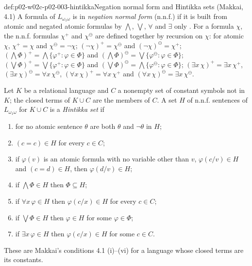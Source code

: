 \begin{hbdefinition}{def:p02-w02c-p02-003-hintikka}{Negation normal form and Hintikka sets (Makkai, 4.1)}
A formula of \(L_{\omega_1\omega}\) is in \emph{negation normal form}
(n.n.f.) if it is built from atomic and negated atomic formulas by
\(\bigwedge\), \(\bigvee\), \(\forall\) and \(\exists\) only
\cite[ch.~A.7, \S4, p.~249]{Makkai1977}.  For a formula \(\chi\), the
n.n.f. formulas \(\chi^{+}\) and \(\chi^{\ominus}\) are defined together
by recursion on \(\chi\): for atomic \(\chi\), \(\chi^{+}=\chi\) and
\(\chi^{\ominus}=\neg\chi\); \((\neg\chi)^{+}=\chi^{\ominus}\) and
\((\neg\chi)^{\ominus}=\chi^{+}\);
\((\bigwedge\Phi)^{+}=\bigwedge\{\varphi^{+}:\varphi\in\Phi\}\) and
\((\bigwedge\Phi)^{\ominus}=\bigvee\{\varphi^{\ominus}:\varphi\in\Phi\}\);
\((\bigvee\Phi)^{+}=\bigvee\{\varphi^{+}:\varphi\in\Phi\}\) and
\((\bigvee\Phi)^{\ominus}=\bigwedge\{\varphi^{\ominus}:\varphi\in\Phi\}\);
\((\exists x\,\chi)^{+}=\exists x\,\chi^{+}\),
\((\exists x\,\chi)^{\ominus}=\forall x\,\chi^{\ominus}\),
\((\forall x\,\chi)^{+}=\forall x\,\chi^{+}\) and
\((\forall x\,\chi)^{\ominus}=\exists x\,\chi^{\ominus}\).

Let \(K\) be a relational language and \(C\) a nonempty set of constant
symbols not in \(K\); the closed terms of \(K\cup C\) are the members of
\(C\).  A set \(H\) of n.n.f. sentences of \(L_{\omega_1\omega}\) for
\(K\cup C\) is a \emph{Hintikka set} if
\begin{enumerate}
\item[(i)] for no atomic sentence \(\theta\) are both \(\theta\) and
      \(\neg\theta\) in \(H\);
\item[(iia)] \((c=c)\in H\) for every \(c\in C\);
\item[(iib)] if \(\varphi(v)\) is an atomic formula with no variable other
      than \(v\), \(\varphi(c/v)\in H\) and \((c=d)\in H\), then
      \(\varphi(d/v)\in H\);
\item[(iii)] if \(\bigwedge\Phi\in H\) then \(\Phi\subseteq H\);
\item[(iv)] if \(\forall x\,\varphi\in H\) then \(\varphi(c/x)\in H\) for
      every \(c\in C\);
\item[(v)] if \(\bigvee\Phi\in H\) then \(\varphi\in H\) for some
      \(\varphi\in\Phi\);
\item[(vi)] if \(\exists x\,\varphi\in H\) then \(\varphi(c/x)\in H\) for
      some \(c\in C\).
\end{enumerate}
These are Makkai's conditions 4.1 (i)--(vi)
\cite[ch.~A.7, \S4, 4.1, p.~250]{Makkai1977} for a language whose closed
terms are its constants.
\end{hbdefinition}

